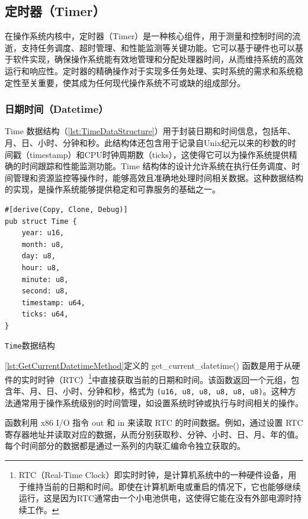 \subsection{定时器（Timer）}

在操作系统内核中，定时器（Timer）是一种核心组件，用于测量和控制时间的流逝，支持任务调度、超时管理、和性能监测等关键功能。它可以基于硬件也可以基于软件实现，确保操作系统能有效地管理和分配处理器时间，从而维持系统的高效运行和响应性。定时器的精确操作对于实现多任务处理、实时系统的需求和系统稳定性至关重要，使其成为任何现代操作系统不可或缺的组成部分。

\subsubsection{日期时间（Datetime）}

Time 数据结构（\cref{lst:TimeDataStructure}）用于封装日期和时间信息，包括年、月、日、小时、分钟和秒。此结构体还包含用于记录自Unix纪元以来的秒数的时间戳（timestamp）和CPU时钟周期数（ticks），这使得它可以为操作系统提供精确的时间跟踪和性能监测功能。Time 结构体的设计允许系统在执行任务调度、时间管理和资源监控等操作时，能够高效且准确地处理时间相关数据。这种数据结构的实现，是操作系统能够提供稳定和可靠服务的基础之一。

\begin{listing}[htbp]
    \begin{verbatim}
#[derive(Copy, Clone, Debug)]
pub struct Time {
    year: u16,
    month: u8,
    day: u8,
    hour: u8,
    minute: u8,
    second: u8,
    timestamp: u64,
    ticks: u64,
}
    \end{verbatim}
    \caption{\texttt{Time}数据结构}\label{lst:TimeDataStructure}
\end{listing}

\cref{lst:GetCurrentDatetimeMethod}定义的 get\_current\_datetime() 函数是用于从硬件的实时时钟（RTC）\footnote{RTC（Real-Time Clock）即实时时钟，是计算机系统中的一种硬件设备，用于维持当前的日期和时间。即使在计算机断电或重启的情况下，它也能够继续运行，这是因为RTC通常由一个小电池供电，这使得它能在没有外部电源时持续工作。}中直接获取当前的日期和时间。该函数返回一个元组，包含年、月、日、小时、分钟和秒，格式为 \texttt{(u16, u8, u8, u8, u8, u8)}。这种方法通常用于操作系统级别的时间管理，如设置系统时钟或执行与时间相关的操作。

函数利用 x86 I/O 指令 out 和 in 来读取 RTC 的时间数据。例如，通过设置 RTC 寄存器地址并读取对应的数据，从而分别获取秒、分钟、小时、日、月、年的值。每个时间部分的数据都是通过一系列的内联汇编命令独立获取的。

